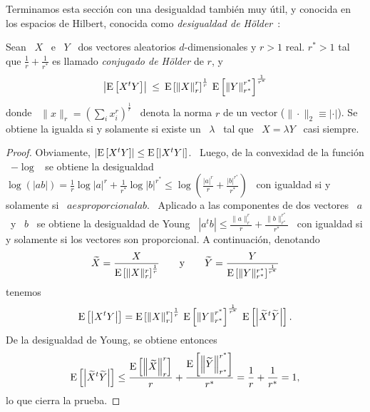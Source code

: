 {Terminamos esta secci\'on  con una desigualdad tambi\'en muy  \'util, y conocida
en   los   espacios   de    Hilbert,   conocida   como   {\it   desigualdad   de
  H\"older}~\cite{Hol98}:
%
\begin{teorema}
  Sean \  $X$ \ e \  $Y$ \ dos vectores  aleatorios $d$-dimensionales y  $r > 1$
  real. $r^* >  1$ tal que $\frac1r + \frac1{r^*}$ es  llamado {\it conjugado de
    H\"older} de $r$, y
  \[
  \left|  \operatorname{E}\left[  X^t Y  \right]  \right| \:  \le  \:  \operatorname{E}\left[ \left\|  X
    \right\|_r^r   \right]^{\frac1r}  \:  \operatorname{E}\left[   \left\|  Y
    \right\|_{r^*}^{r^*} \right]^{\frac1{r^*}}
  \]
  donde \ $\| x \|_r =  \left( \sum_i x_i^r \right)^{\frac1r}$ \ denota la norma
  $r$ de un  vector ($\|\cdot\|_2 \equiv |\cdot|$).  Se obtiene  la igualda si y
  solamente si existe un \ $\lambda$ \ tal que \ $X = \lambda Y$ \ casi siempre.
\end{teorema}
%
\begin{proof}
  Obviamente, $\left| \operatorname{E}\left[ X^t Y \right] \right| \le \operatorname{E}\left[ \left| X^t
      Y \right| \right]$. \ Luego, de  la convexidad de la funci\'on \ $-\log$ \
  se  obtiene  la  desigualdad  \  $\log(|a  b|) =  \frac1r  \log  |a|^r  +
  \frac1{r^*} \log  |b|^{r^*} \le \log\left( \frac{|a|^r}{r}
    + \frac{|b|^{r^*}}{r^*} \right)$ \  con igualdad si y solamente si
  \ $a es proporcional a b$. \  Aplicado a las componentes de dos vectores \ $a$
  \ y  \ $b$ \ se  obtiene la desigualdad de  Young \ $\left| a^t  b \right| \le
  \frac{\|a\|_r^r}{r}                                            +
  \frac{\|b\|_{r^*}^{r^*}}{r^*}$ \ con igualdad si y solamente si
  los vectores son proporcional. A continuaci\'on, denotando
  \[
  \widetilde{X}         =         \frac{X}{\operatorname{E}\left[        \|X\|_r^r
    \right]^{\frac1r}}    \qquad    \mbox{y}    \qquad   \widetilde{Y}    =
  \frac{Y}{\operatorname{E}\left[ \|Y\|_{r^*}^{r^*} \right]^{\frac1{r^*}}}
  \]
  tenemos
  \[
  \operatorname{E}\left[   \left|   X^t  Y   \right|   \right]   =   \operatorname{E}\left[  \left\|   X
    \right\|_r^r   \right]^{\frac1r}  \:  \operatorname{E}\left[   \left\|  Y
    \right\|_{r^*}^{r^*}   \right]^{\frac1{r^*}}   \:  \operatorname{E}\left[
    \left| \widetilde{X}^t \widetilde{Y} \right| \right].
  \]
  De la desigualdad de Young, se obtiene entonces
  \[
  \operatorname{E}\left[   \left|   \widetilde{X}^t   \widetilde{Y}  \right|   \right]   \le
  \frac{\operatorname{E}\left[ \left\| \widetilde{X} \right\|_r^r \right]}{r}
  +   \frac{\operatorname{E}\left[   \left\|  \widetilde{Y}   \right\|_{r^*}^{r^*}
    \right]}{r^*} = \frac1r + \frac1{r^*} = 1,
  \]
  lo que cierra la prueba.
\end{proof}

}
